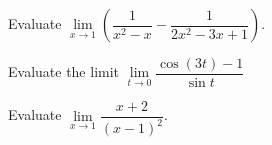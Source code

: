 \begin{exercise}
Evaluate
\(\lim\limits_{x\to 1}\left(\dfrac1{x^2-x}-\dfrac{1}{2x^2-3x+1}\right)\).
\end{exercise}
\vspace*{6\baselineskip}

\begin{exercise}
Evaluate the limit
\(\lim\limits_{t\to 0}\dfrac{\cos(3t)-1}{\sin t}\)
\end{exercise}
\vspace*{6\baselineskip}

\begin{exercise}
Evaluate
\(\lim\limits_{x\to 1}\dfrac{x+2}{(x-1)^2}\).
\end{exercise}
\vspace*{6\baselineskip}
